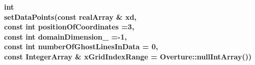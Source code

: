 \begin{flushleft} \textbf{%
int  \\ 
\settowidth{\DataPointMappingIncludeArgIndent}{setDataPoints(}%
setDataPoints(const realArray \& xd,\\ 
\hspace{\DataPointMappingIncludeArgIndent}const int positionOfCoordinates  =3, \\ 
\hspace{\DataPointMappingIncludeArgIndent}const int domainDimension\_  =-1,\\ 
\hspace{\DataPointMappingIncludeArgIndent}const int numberOfGhostLinesInData  = 0,\\ 
const IntegerArray \& xGridIndexRange  = Overture::nullIntArray()) 
}\end{flushleft}
